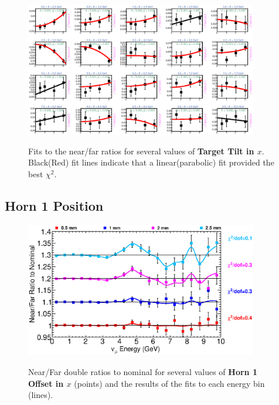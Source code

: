 \begin{figure}[hb]
  \begin{center}
    {\includegraphics[width=4.0in]{figures/TargetXTilt_nof_fits.eps}}
  \end{center}
\caption{ Fits to the near/far ratios for several values of {\bf Target Tilt in $x$}. Black(Red) fit lines indicate that a linear(parabolic) fit provided the best $\chi^2$. }
\end{figure}

\clearpage
\subsection{Horn 1 Position}

\begin{figure}[ht]
  \begin{center}
    {\includegraphics[width=4.0in]{figures/Horn1XOffset_nof_summary.eps}}
  \end{center}
\caption{ Near/Far double ratios to nominal for several values of {\bf Horn 1 Offset in $x$} (points) and the results of the fits to each energy bin (lines).}
\end{figure}

